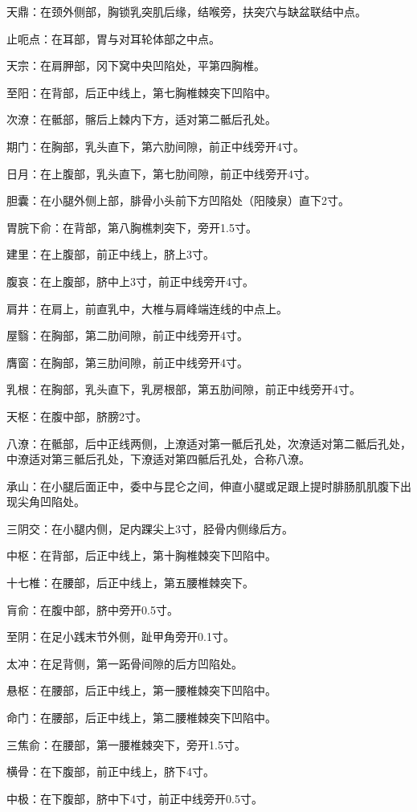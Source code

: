 \documentclass[12pt,UTF8]{ctexbook}
\begin{document}
天鼎：在颈外侧部，胸锁乳突肌后缘，结喉旁，扶突穴与缺盆联结中点。

止呃点：在耳部，胃与对耳轮体部之中点。

天宗：在肩胛部，冈下窝中央凹陷处，平第四胸椎。

至阳：在背部，后正中线上，第七胸椎棘突下凹陷中。

次潦：在骶部，髂后上棘内下方，适对第二骶后孔处。

期门：在胸部，乳头直下，第六肋间隙，前正中线旁开4寸。

日月：在上腹部，乳头直下，第七肋间隙，前正中线旁开4寸。

胆囊：在小腿外侧上部，腓骨小头前下方凹陷处（阳陵泉）直下2寸。

胃脘下俞：在背部，第八胸樵刺突下，旁开1.5寸。

建里：在上腹部，前正中线上，脐上3寸。

腹哀：在上腹部，脐中上3寸，前正中线旁开4寸。

肩井：在肩上，前直乳中，大椎与肩峰端连线的中点上。

屋翳：在胸部，第二肋间隙，前正中线旁开4寸。

膺窗：在胸部，第三肋间隙，前正中线旁开4寸。

乳根：在胸部，乳头直下，乳房根部，第五肋间隙，前正中线旁开4寸。

天枢：在腹中部，脐膀2寸。

八潦：在骶部，后中正线两侧，上潦适对第一骶后孔处，次潦适对第二骶后孔处，中潦适对第三骶后孔处，下潦适对第四骶后孔处，合称八潦。

承山：在小腿后面正中，委中与昆仑之间，伸直小腿或足跟上提时腓肠肌肌腹下出现尖角凹陷处。

三阴交：在小腿内侧，足内踝尖上3寸，胫骨内侧缘后方。

中枢：在背部，后正中线上，第十胸椎棘突下凹陷中。

十七椎：在腰部，后正中线上，第五腰椎棘突下。

肓俞：在腹中部，脐中旁开0.5寸。

至阴：在足小践末节外侧，趾甲角旁开0.1寸。

太冲：在足背侧，第一跖骨间隙的后方凹陷处。

悬枢：在腰部，后正中线上，第一腰椎棘突下凹陷中。

命门：在腰部，后正中线上，第二腰椎棘突下凹陷中。

三焦俞：在腰部，第一腰椎棘突下，旁开1.5寸。

横骨：在下腹部，前正中线上，脐下4寸。

中极：在下腹部，脐中下4寸，前正中线旁开0.5寸。
\end{document}
